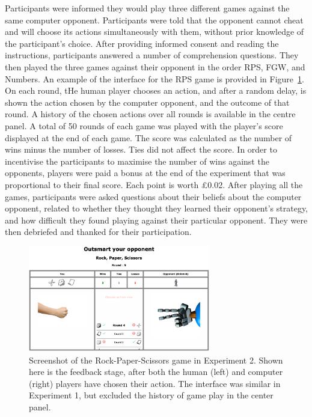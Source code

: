 \documentclass[
  english,
  man,floatsintext]{apa6}
\begin{document}
Participants were informed they would play three different games against the same computer opponent. Participants were told that the opponent cannot cheat and will choose its actions simultaneously with them, without prior knowledge of the participant's choice. After providing informed consent and reading the instructions, participants answered a number of comprehension questions. They then played the three games against their opponent in the order RPS, FGW, and Numbers. An example of the interface for the RPS game is provided in Figure~\ref{fig:feedback-rps-exp2}. On each round, tHe human player chooses an action, and after a random delay, is shown the action chosen by the computer opponent, and the outcome of that round. A history of the chosen actions over all rounds is available in the centre panel. A total of 50 rounds of each game was played with the player's score displayed at the end of each game. The score was calculated as the number of wins minus the number of losses. Ties did not affect the score. In order to incentivise the participants to maximise the number of wins against the opponents, players were paid a bonus at the end of the experiment that was proportional to their final score. Each point is worth £0.02. After playing all the games, participants were asked questions about their beliefs about the computer opponent, related to whether they thought they learned their opponent's strategy, and how difficult they found playing against their particular opponent. They were then debriefed and thanked for their participation.

\begin{figure}

{\centering \includegraphics[width=3.13in]{images/feedback_rps} 

}

\caption{Screenshot of the Rock-Paper-Scissors game in Experiment 2. Shown here is the feedback stage, after both the human (left) and computer (right) players have chosen their action. The interface was similar in Experiment 1, but excluded the history of game play in the center panel.}\label{fig:feedback-rps-exp2}
\end{figure}
\end{document}
